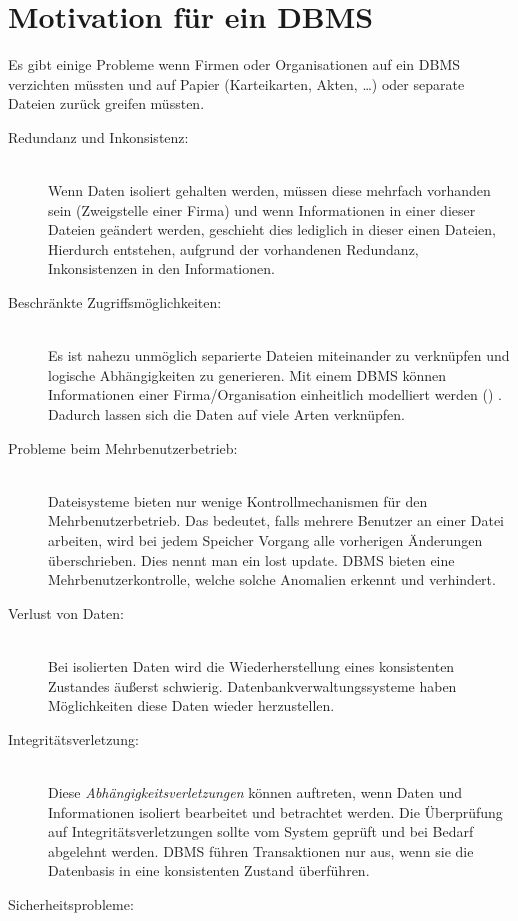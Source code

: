 \section{Motivation für ein DBMS}
Es gibt einige Probleme wenn Firmen oder Organisationen auf ein DBMS verzichten müssten und auf Papier (Karteikarten, Akten, \dots) oder separate Dateien zurück greifen müssten. 
\begin{description}
  \item[Redundanz und Inkonsistenz:] \hfill\\
   Wenn Daten isoliert gehalten werden, müssen diese mehrfach vorhanden sein (Zweigstelle einer Firma) und wenn Informationen in einer dieser Dateien geändert werden, geschieht dies lediglich in dieser einen Dateien, Hierdurch entstehen, aufgrund der vorhandenen Redundanz, Inkonsistenzen in den Informationen. 
  \item[Beschränkte Zugriffsmöglichkeiten:] \hfill \\
  	Es ist nahezu unmöglich separierte Dateien miteinander zu verknüpfen und logische Abhängigkeiten zu generieren. Mit einem DBMS können Informationen einer Firma/Organisation einheitlich modelliert werden () . Dadurch lassen sich die Daten auf viele Arten verknüpfen. 
  \item[Probleme beim Mehrbenutzerbetrieb:] \hfill \\
  	Dateisysteme bieten nur wenige Kontrollmechanismen für den Mehrbenutzerbetrieb. Das bedeutet, falls mehrere Benutzer an einer Datei arbeiten, wird bei jedem Speicher Vorgang alle vorherigen Änderungen überschrieben. Dies nennt man ein \glqq{}lost update\grqq{}. DBMS bieten eine Mehrbenutzerkontrolle, welche solche Anomalien erkennt und verhindert. 
  \item[Verlust von Daten:] \hfill \\ 
  	Bei isolierten Daten wird die Wiederherstellung eines konsistenten Zustandes äußerst schwierig. Datenbankverwaltungssysteme haben Möglichkeiten diese Daten wieder herzustellen.
  \item[Integritätsverletzung:]\hfill \\ 
  	Diese \textit{Abhängigkeitsverletzungen} können auftreten, wenn Daten und Informationen isoliert bearbeitet und betrachtet werden. Die Überprüfung auf Integritätsverletzungen sollte vom System geprüft und bei Bedarf abgelehnt werden. DBMS führen Transaktionen nur aus, wenn sie die Datenbasis in eine konsistenten Zustand überführen. 
  \item[Sicherheitsprobleme:] \hfill \\

\end{description}
